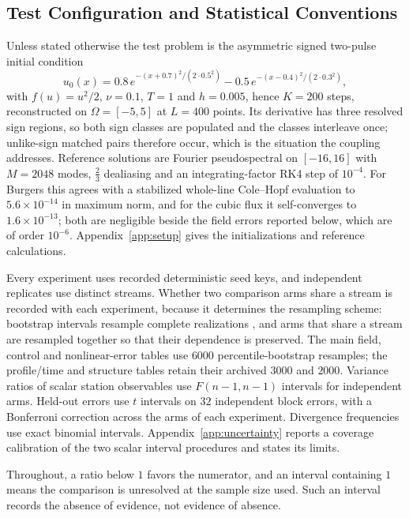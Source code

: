 \documentclass[smallextended,nospthms]{svjour3}
\theoremstyle{plain}
\theoremstyle{definition}
\theoremstyle{remark}
\numberwithin{equation}{section}
\begin{document}
\subsection{Test Configuration and Statistical Conventions}
\label{sec:setup}

Unless stated otherwise the test problem is the asymmetric signed two-pulse
initial condition
\begin{equation}
  u_0(x)=0.8\,e^{-(x+0.7)^2/(2\cdot 0.5^2)}-0.5\,e^{-(x-0.4)^2/(2\cdot 0.3^2)},
  \label{eq:twopulse}
\end{equation}
with $f(u)=u^2/2$, $\nu=0.1$, $T=1$ and $h=0.005$, hence $K=200$ steps,
reconstructed on $\Omega=[-5,5]$ at $L=400$ points. Its derivative has three
resolved sign regions, so both sign classes are populated and the classes
interleave once; unlike-sign matched pairs therefore occur, which is the
situation the coupling addresses. Reference solutions are Fourier
pseudospectral on $[-16,16]$ with $M=2048$ modes, $\tfrac23$ dealiasing and an
integrating-factor RK4 step of $10^{-4}$. For Burgers this agrees with a
stabilized whole-line Cole--Hopf evaluation to $5.6\times10^{-14}$ in maximum
norm, and for the cubic flux it self-converges to $1.6\times10^{-13}$; both are
negligible beside the field errors reported below, which are of order
$10^{-6}$. Appendix~\ref{app:setup} gives the initializations and reference
calculations.

Every experiment uses recorded deterministic seed keys, and independent
replicates use distinct streams. Whether two comparison arms share a stream is
recorded with each experiment, because it determines the resampling scheme:
bootstrap intervals resample complete realizations \citep{efron1981}, and arms
that share a stream are resampled together so that their dependence is
preserved. The main field, control and nonlinear-error tables use $6000$
percentile-bootstrap resamples; the profile/time and structure tables retain
their archived $3000$ and $2000$. Variance ratios of scalar station observables
use $F(n-1,n-1)$ intervals for independent arms. Held-out errors use $t$
intervals on $32$ independent block errors, with a Bonferroni correction across
the arms of each experiment. Divergence frequencies use exact binomial
intervals. Appendix~\ref{app:uncertainty} reports a coverage calibration of the
two scalar interval procedures and states its limits.

Throughout, a ratio below $1$ favors the numerator, and an interval containing
$1$ means the comparison is unresolved at the sample size used. Such an
interval records the absence of evidence, not evidence of absence.
\end{document}
